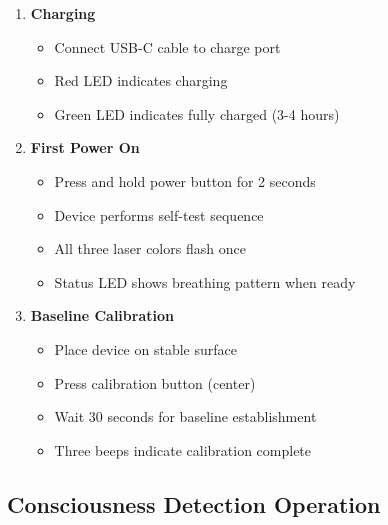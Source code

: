 \documentclass[12pt,a4paper]{article}
\begin{document}
\begin{enumerate}
\item \textbf{Charging}
    \begin{itemize}
    \item Connect USB-C cable to charge port
    \item Red LED indicates charging
    \item Green LED indicates fully charged (3-4 hours)
    \end{itemize}

\item \textbf{First Power On}
    \begin{itemize}
    \item Press and hold power button for 2 seconds
    \item Device performs self-test sequence
    \item All three laser colors flash once
    \item Status LED shows breathing pattern when ready
    \end{itemize}

\item \textbf{Baseline Calibration}
    \begin{itemize}
    \item Place device on stable surface
    \item Press calibration button (center)
    \item Wait 30 seconds for baseline establishment
    \item Three beeps indicate calibration complete
    \end{itemize}
\end{enumerate}

\subsection{Consciousness Detection Operation}
\end{document}

